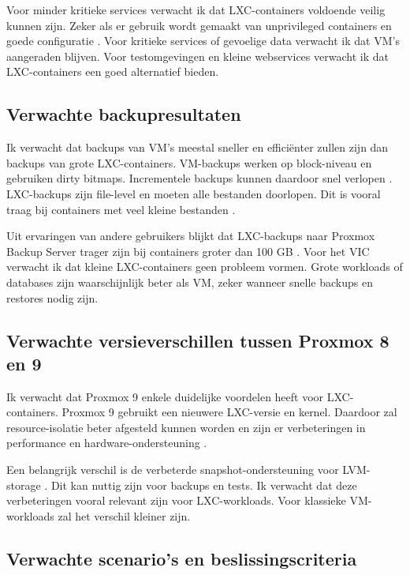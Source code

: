 Voor minder kritieke services verwacht ik dat LXC-containers voldoende veilig kunnen zijn. Zeker als er gebruik wordt gemaakt van unprivileged containers en goede configuratie \autocite{SecurityLabs2023}. Voor kritieke services of gevoelige data verwacht ik dat VM's aangeraden blijven. Voor testomgevingen en kleine webservices verwacht ik dat LXC-containers een goed alternatief bieden.

\subsection{Verwachte backupresultaten}

Ik verwacht dat backups van VM's meestal sneller en efficiënter zullen zijn dan backups van grote LXC-containers. VM-backups werken op block-niveau en gebruiken dirty bitmaps. Incrementele backups kunnen daardoor snel verlopen \autocite{ItNotes2020}. LXC-backups zijn file-level en moeten alle bestanden doorlopen. Dit is vooral traag bij containers met veel kleine bestanden \autocite{ProxmoxForum2021, ProxmoxForum2024}.

Uit ervaringen van andere gebruikers blijkt dat LXC-backups naar Proxmox Backup Server trager zijn bij containers groter dan 100 GB \autocite{ProxmoxForum2025}. Voor het VIC verwacht ik dat kleine LXC-containers geen probleem vormen. Grote workloads of databases zijn waarschijnlijk beter als VM, zeker wanneer snelle backups en restores nodig zijn.

\subsection{Verwachte versieverschillen tussen Proxmox 8 en 9}

Ik verwacht dat Proxmox 9 enkele duidelijke voordelen heeft voor LXC-containers. Proxmox 9 gebruikt een nieuwere LXC-versie en kernel. Daardoor zal resource-isolatie beter afgesteld kunnen worden en zijn er verbeteringen in performance en hardware-ondersteuning \autocite{Xtom2025, UnixHost2025}. 

Een belangrijk verschil is de verbeterde snapshot-ondersteuning voor LVM-storage \autocite{Proxmox2025, Saturnme2025}. Dit kan nuttig zijn voor backups en tests. Ik verwacht dat deze verbeteringen vooral relevant zijn voor LXC-workloads. Voor klassieke VM-workloads zal het verschil kleiner zijn.

\subsection{Verwachte scenario's en beslissingscriteria}

